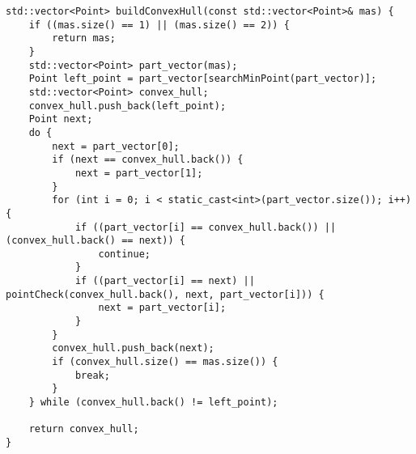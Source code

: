 \documentclass{report}
\begin{document}
\begin{lstlisting}
std::vector<Point> buildConvexHull(const std::vector<Point>& mas) {
    if ((mas.size() == 1) || (mas.size() == 2)) {
        return mas;
    }
    std::vector<Point> part_vector(mas);
    Point left_point = part_vector[searchMinPoint(part_vector)];
    std::vector<Point> convex_hull;
    convex_hull.push_back(left_point);
    Point next;
    do {
        next = part_vector[0];
        if (next == convex_hull.back()) {
            next = part_vector[1];
        }
        for (int i = 0; i < static_cast<int>(part_vector.size()); i++) {
            if ((part_vector[i] == convex_hull.back()) || (convex_hull.back() == next)) {
                continue;
            }
            if ((part_vector[i] == next) || pointCheck(convex_hull.back(), next, part_vector[i])) {
                next = part_vector[i];
            }
        }
        convex_hull.push_back(next);
        if (convex_hull.size() == mas.size()) {
            break;
        }
    } while (convex_hull.back() != left_point);

    return convex_hull;
}
\end{lstlisting}
\end{document}
